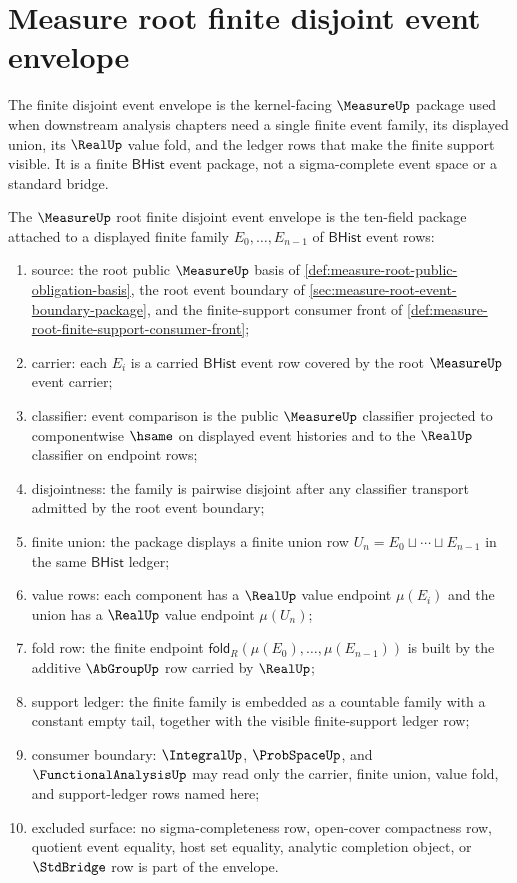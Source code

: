 \section{Measure root finite disjoint event envelope}
\label{sec:measure-root-finite-disjoint-event-envelope}

The finite disjoint event envelope is the kernel-facing $\MeasureUp$ package
used when downstream analysis chapters need a single finite event family,
its displayed union, its $\RealUp$ value fold, and the ledger rows that make
the finite support visible. It is a finite $\mathsf{BHist}$ event package,
not a sigma-complete event space or a standard bridge.

\begin{definition}
\label{def:measure-root-finite-disjoint-envelope}
The $\MeasureUp$ root finite disjoint event envelope is the ten-field package
attached to a displayed finite family $E_0,\ldots,E_{n-1}$ of
$\mathsf{BHist}$ event rows:
\begin{enumerate}
  \item source: the root public $\MeasureUp$ basis of
  \autoref{def:measure-root-public-obligation-basis}, the root event boundary
  of \autoref{sec:measure-root-event-boundary-package}, and the finite-support
  consumer front of \autoref{def:measure-root-finite-support-consumer-front};
  \item carrier: each $E_i$ is a carried $\mathsf{BHist}$ event row covered by
  the root $\MeasureUp$ event carrier;
  \item classifier: event comparison is the public $\MeasureUp$ classifier
  projected to componentwise $\hsame$ on displayed event histories and to the
  $\RealUp$ classifier on endpoint rows;
  \item disjointness: the family is pairwise disjoint after any classifier
  transport admitted by the root event boundary;
  \item finite union: the package displays a finite union row
  $U_n=E_0\sqcup\cdots\sqcup E_{n-1}$ in the same $\mathsf{BHist}$ ledger;
  \item value rows: each component has a $\RealUp$ value endpoint $\mu(E_i)$
  and the union has a $\RealUp$ value endpoint $\mu(U_n)$;
  \item fold row: the finite endpoint
  $\mathsf{fold}_R(\mu(E_0),\ldots,\mu(E_{n-1}))$ is built by the additive
  $\AbGroupUp$ row carried by $\RealUp$;
  \item support ledger: the finite family is embedded as a countable family
  with a constant empty tail, together with the visible finite-support
  ledger row;
  \item consumer boundary: $\IntegralUp$, $\ProbSpaceUp$, and
  $\FunctionalAnalysisUp$ may read only the carrier, finite union, value fold,
  and support-ledger rows named here;
  \item excluded surface: no sigma-completeness row, open-cover compactness
  row, quotient event equality, host set equality, analytic completion
  object, or $\StdBridge$ row is part of the envelope.
\end{enumerate}
\end{definition}

